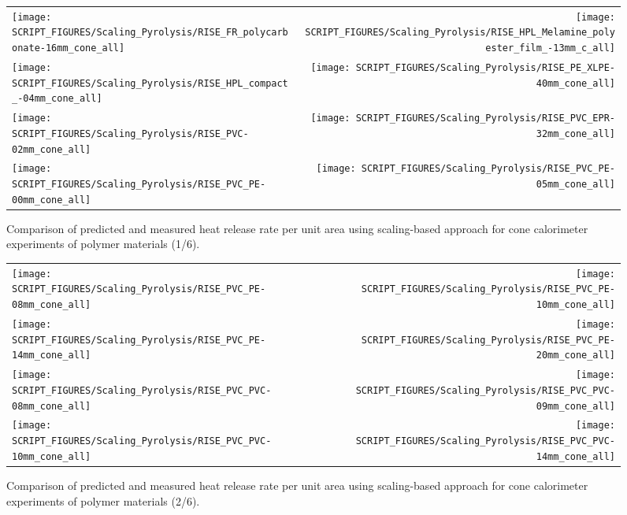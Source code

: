 \begin{figure}[!h]
\begin{tabular*}{\textwidth}{l@{\extracolsep{\fill}}r}
\texttt{[image: SCRIPT\_FIGURES/Scaling\_Pyrolysis/RISE\_FR\_polycarbonate-16mm\_cone\_all]} &
\texttt{[image: SCRIPT\_FIGURES/Scaling\_Pyrolysis/RISE\_HPL\_Melamine\_polyester\_film\_-13mm\_c\_all]} \\
\texttt{[image: SCRIPT\_FIGURES/Scaling\_Pyrolysis/RISE\_HPL\_compact\_-04mm\_cone\_all]} &
\texttt{[image: SCRIPT\_FIGURES/Scaling\_Pyrolysis/RISE\_PE\_XLPE-40mm\_cone\_all]} \\
\texttt{[image: SCRIPT\_FIGURES/Scaling\_Pyrolysis/RISE\_PVC-02mm\_cone\_all]} &
\texttt{[image: SCRIPT\_FIGURES/Scaling\_Pyrolysis/RISE\_PVC\_EPR-32mm\_cone\_all]} \\
\texttt{[image: SCRIPT\_FIGURES/Scaling\_Pyrolysis/RISE\_PVC\_PE-00mm\_cone\_all]} &
\texttt{[image: SCRIPT\_FIGURES/Scaling\_Pyrolysis/RISE\_PVC\_PE-05mm\_cone\_all]} \\
\end{tabular*}
\caption[HRRPUA of RISE materials using scaling model, polymer materials]
{Comparison of predicted and measured heat release rate per unit area using scaling-based approach for cone calorimeter experiments of polymer materials (1/6).}
\label{RISE_Materials_polymers1}
\end{figure}

\begin{figure}[!h]
\begin{tabular*}{\textwidth}{l@{\extracolsep{\fill}}r}
\texttt{[image: SCRIPT\_FIGURES/Scaling\_Pyrolysis/RISE\_PVC\_PE-08mm\_cone\_all]} &
\texttt{[image: SCRIPT\_FIGURES/Scaling\_Pyrolysis/RISE\_PVC\_PE-10mm\_cone\_all]} \\
\texttt{[image: SCRIPT\_FIGURES/Scaling\_Pyrolysis/RISE\_PVC\_PE-14mm\_cone\_all]} &
\texttt{[image: SCRIPT\_FIGURES/Scaling\_Pyrolysis/RISE\_PVC\_PE-20mm\_cone\_all]} \\
\texttt{[image: SCRIPT\_FIGURES/Scaling\_Pyrolysis/RISE\_PVC\_PVC-08mm\_cone\_all]} &
\texttt{[image: SCRIPT\_FIGURES/Scaling\_Pyrolysis/RISE\_PVC\_PVC-09mm\_cone\_all]} \\
\texttt{[image: SCRIPT\_FIGURES/Scaling\_Pyrolysis/RISE\_PVC\_PVC-10mm\_cone\_all]} &
\texttt{[image: SCRIPT\_FIGURES/Scaling\_Pyrolysis/RISE\_PVC\_PVC-14mm\_cone\_all]} \\
\end{tabular*}
\caption[HRRPUA of RISE materials using scaling model, polymer materials]
{Comparison of predicted and measured heat release rate per unit area using scaling-based approach for cone calorimeter experiments of polymer materials (2/6).}
\label{RISE_Materials_polymers2}
\end{figure}

